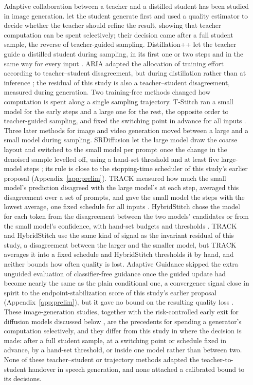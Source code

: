 Adaptive collaboration between a teacher and a distilled student has been studied in image generation. \textcite{starodubcev2024your} let the student generate first and used a quality estimator to decide whether the teacher should refine the result, showing that teacher computation can be spent selectively; their decision came after a full student sample, the reverse of teacher-guided sampling. Distillation++ let the teacher guide a distilled student during sampling, in its first one or two steps and in the same way for every input \parencite{park2025distillation}. ARIA adapted the allocation of training effort according to teacher--student disagreement, but during distillation rather than at inference \parencite{mualem2026aria}; the residual of this study is also a teacher--student disagreement, measured during generation. Two training-free methods changed how computation is spent along a single sampling trajectory. T-Stitch ran a small model for the early steps and a large one for the rest, the opposite order to teacher-guided sampling, and fixed the switching point in advance for all inputs \parencite{pan2025tstitch}. Three later methods for image and video generation moved between a large and a small model during sampling. SRDiffusion let the large model draw the coarse layout and switched to the small model per prompt once the change in the denoised sample levelled off, using a hand-set threshold and at least five large-model steps \parencite{cheng2025srdiffusion}; its rule is close to the stopping-time scheduler of this study's earlier proposal (Appendix~\ref{app:prelim}). TRACK measured how much the small model's prediction disagreed with the large model's at each step, averaged this disagreement over a set of prompts, and gave the small model the steps with the lowest average, one fixed schedule for all inputs \parencite{munir2026track}. HybridStitch chose the model for each token from the disagreement between the two models' candidates or from the small model's confidence, with hand-set budgets and thresholds \parencite{sun2026hybridstitch}. TRACK and HybridStitch use the same kind of signal as the invariant residual of this study, a disagreement between the larger and the smaller model, but TRACK averages it into a fixed schedule and HybridStitch thresholds it by hand, and neither bounds how often quality is lost. Adaptive Guidance skipped the extra unguided evaluation of classifier-free guidance once the guided update had become nearly the same as the plain conditional one, a convergence signal close in spirit to the endpoint-stabilization score of this study's earlier proposal (Appendix~\ref{app:prelim}), but it gave no bound on the resulting quality loss \parencite{castillo2025adaptive}. These image-generation studies, together with the risk-controlled early exit for diffusion models discussed below \parencite{jazbec2024fast}, are the precedents for spending a generator's computation selectively, and they differ from this study in where the decision is made: after a full student sample, at a switching point or schedule fixed in advance, by a hand-set threshold, or inside one model rather than between two. None of these teacher--student or trajectory methods adapted the teacher-to-student handover in speech generation, and none attached a calibrated bound to its decisions.

